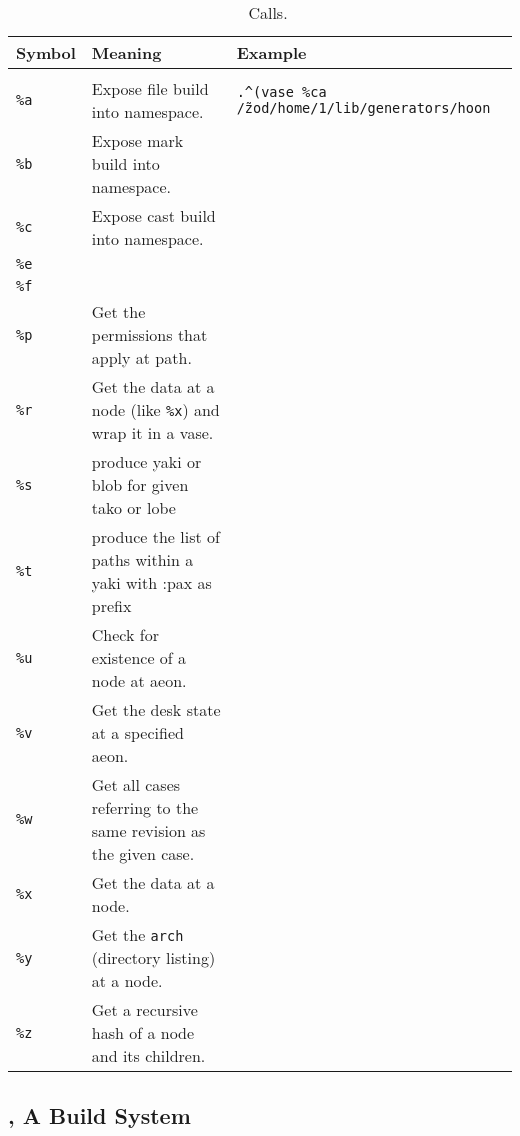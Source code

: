 \begin{table}[h!]
  \begin{center}
    \caption{\clay~\dotket~Calls.}
    \label{ha:clay}
    \begin{tabular}{lll}
      Symbol & Meaning & Example \\
      \hline \\
      \texttt{\%a} & Expose file build into namespace. & \texttt{.\^{}(vase \%ca /\~zod/home/1/lib/generators/hoon} \\
      \texttt{\%b} & Expose mark build into namespace. & \\
      \texttt{\%c} & Expose cast build into namespace. & \\
      \texttt{\%e} & & \\
      \texttt{\%f} & & \\
      \texttt{\%p} & Get the permissions that apply at path. & \\
      \texttt{\%r} & Get the data at a node (like \texttt{\%x}) and wrap it in a vase. & \\
      \texttt{\%s} & produce yaki or blob for given tako or lobe & \\
      \texttt{\%t} & produce the list of paths within a yaki with :pax as prefix & \\
      \texttt{\%u} & Check for existence of a node at aeon. & \\
      \texttt{\%v} & Get the desk state at a specified aeon. & \\
      \texttt{\%w} & Get all cases referring to the same revision as the given case. & \\
      \texttt{\%x} & Get the data at a node. & \\
      \texttt{\%y} & Get the \texttt{arch} (directory listing) at a node. & \\
      \texttt{\%z} & Get a recursive hash of a node and its children. & \\
    \end{tabular}
  \end{center}
\end{table}



\subsection[\ford]{\ford, A Build System}

